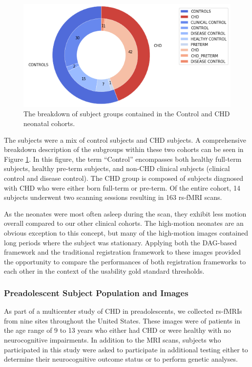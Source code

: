 \begin{figure}
\centering
\includegraphics[width=1.0\textwidth]{5/demo_neonate_subj_cohort.png}
\caption{The breakdown of subject groups contained in the Control and CHD neonatal cohorts.}
\label{ch5:neonates:cohorts}
\end{figure}

The subjects were a mix of control subjects and CHD subjects. A comprehensive breakdown description of the subgroups within these two cohorts can be seen in Figure \ref{ch5:neonates:cohorts}. In this figure, the term ``Control'' encompasses both healthy full-term subjects, healthy pre-term subjects, and non-CHD clinical subjects (clinical control and disease control). The CHD group is composed of subjects diagnosed with CHD who were either born full-term or pre-term. Of the entire cohort, 14 subjects underwent two scanning sessions resulting in 163 rs-fMRI scans.

As the neonates were most often asleep during the scan, they exhibit less motion overall compared to our other clinical cohorts. The high-motion neonates are an obvious exception to this concept, but many of the high-motion images contained long periods where the subject was stationary. Applying both the DAG-based framework and the traditional registration framework to these images provided the opportunity to compare the performances of both registration frameworks to each other in the context of the usability gold standard thresholds. 

\subsubsection{Preadolescent Subject Population and Images}

As part of a multicenter study of CHD in preadolescents, we collected rs-fMRIs from nine sites throughout the United States. These images were of patients in the age range of 9 to 13 years who either had CHD or were healthy with no neurocognitive impairments. In addition to the MRI scans, subjects who participated in this study were asked to participate in additional testing  either to determine their neurocognitive outcome status or to perform genetic analyses. %

